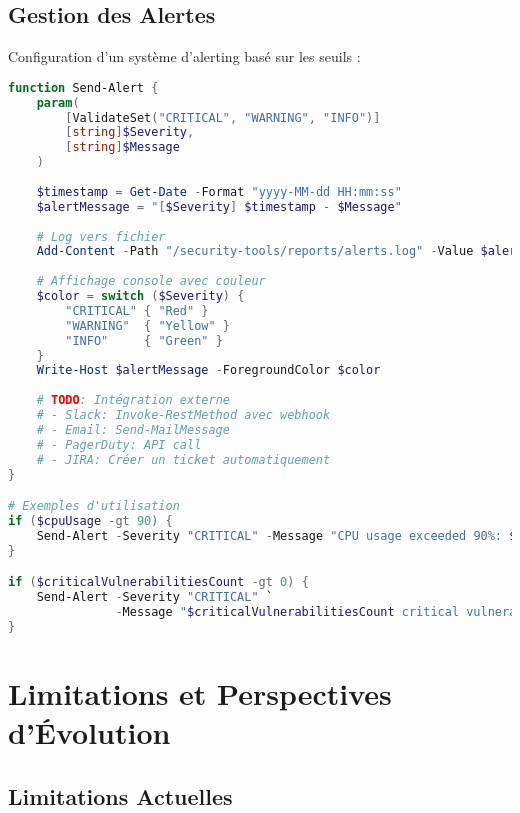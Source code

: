 \documentclass[11pt,a4paper]{report}
\begin{document}
\section{Gestion des Alertes}

Configuration d'un système d'alerting basé sur les seuils :

\begin{lstlisting}[language=PowerShell, caption=Système d'Alerting Simplifié, basicstyle=\ttfamily\tiny]
function Send-Alert {
    param(
        [ValidateSet("CRITICAL", "WARNING", "INFO")]
        [string]$Severity,
        [string]$Message
    )
    
    $timestamp = Get-Date -Format "yyyy-MM-dd HH:mm:ss"
    $alertMessage = "[$Severity] $timestamp - $Message"
    
    # Log vers fichier
    Add-Content -Path "/security-tools/reports/alerts.log" -Value $alertMessage
    
    # Affichage console avec couleur
    $color = switch ($Severity) {
        "CRITICAL" { "Red" }
        "WARNING"  { "Yellow" }
        "INFO"     { "Green" }
    }
    Write-Host $alertMessage -ForegroundColor $color
    
    # TODO: Intégration externe
    # - Slack: Invoke-RestMethod avec webhook
    # - Email: Send-MailMessage
    # - PagerDuty: API call
    # - JIRA: Créer un ticket automatiquement
}

# Exemples d'utilisation
if ($cpuUsage -gt 90) {
    Send-Alert -Severity "CRITICAL" -Message "CPU usage exceeded 90%: $cpuUsage%"
}

if ($criticalVulnerabilitiesCount -gt 0) {
    Send-Alert -Severity "CRITICAL" `
               -Message "$criticalVulnerabilitiesCount critical vulnerabilities detected"
}
\end{lstlisting}


\chapter{Limitations et Perspectives d'Évolution}

\section{Limitations Actuelles}
\end{document}
